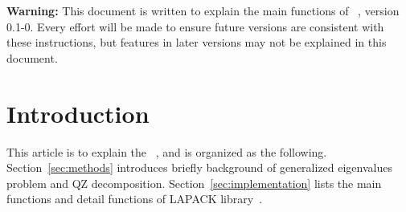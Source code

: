 
{\color{red} \bf Warning:} This document is written to explain the main
functions of ~\citep{Chen2013QZpackage}, version 0.1-0.
Every effort will be made to ensure future versions are consistent with
these instructions, but features in later versions may not be explained
in this document.


\section[Introduction]{Introduction}
\label{sec:introduction}


This article is to explain the ~\citep{Chen2013QZpackage}, and
is organized as the following. Section~\ref{sec:methods} introduces briefly
background of generalized eigenvalues problem and QZ decomposition.
Section~\ref{sec:implementation} lists the main functions and detail
 functions of LAPACK library~\citep{laug}.

